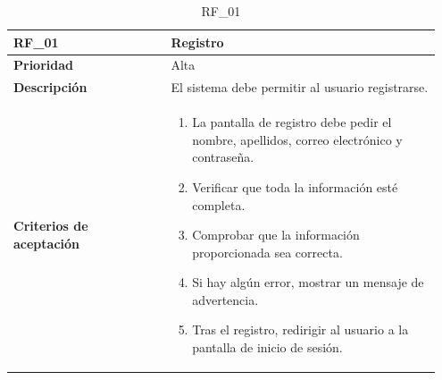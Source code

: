 \parbox{\textwidth}{ 
   
}

\begin{table}[H]
    \centering 
    \begin{tabular}{|p{0.35\linewidth}|p{0.6\linewidth}|}
        \hline
        \rowcolor[HTML]{C0C0C0}  
        \textbf{RF\_01} & \textbf{Registro} \\
        \hline
        \textbf{Prioridad} & Alta \\
        \hline
        \textbf{Descripción} & El sistema debe permitir al usuario registrarse.  \\
        \hline
        \textbf{Criterios de aceptación} & 
        \begin{minipage}[t]{0.9\linewidth}
            \begin{enumerate}
                \item La pantalla de registro debe pedir el nombre, apellidos, correo electrónico y contraseña.
                \item Verificar que toda la información esté completa.
                \item Comprobar que la información proporcionada sea correcta.
                \item Si hay algún error, mostrar un mensaje de advertencia.
                \item Tras el registro, redirigir al usuario a la pantalla de inicio de sesión.
            \end{enumerate}
        \end{minipage} \\
        \hline
    \end{tabular}
    \caption{RF\_01}
    \label{req:RF01}
\end{table}

